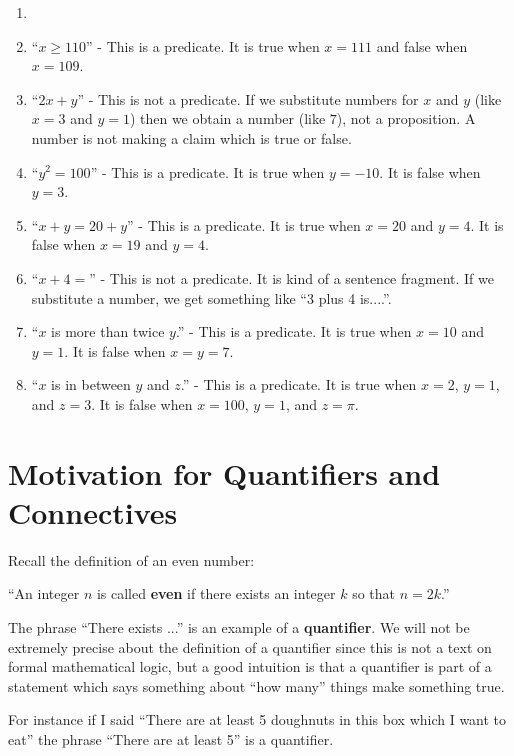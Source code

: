 \begin{solutions}
	
	\begin{enumerate}
		\item[] \mbox{}
		\item ``$x \geq 110$'' - This is a predicate.  It is true when $x = 111$ and false when $x = 109$.
		\item ``$2x+y$'' - This is not a predicate.  If we substitute numbers for $x$ and $y$ (like $x  = 3$  and $y=1$) then we obtain a number (like $7$), not a proposition.  A number is not making a claim which is true or false. 
		\item ``$y^2  = 100$'' - This is a predicate.  It is true when $y = -10$.  It is false when $y = 3$.
		\item ``$x + y = 20 + y$'' - This is a predicate.  It is true when $x = 20$ and $y=4$.  It is false when $x = 19$ and $y=4$.
		\item ``$x+4 = $'' - This is not a predicate.  It is kind of a sentence fragment.  If we substitute a number, we get something like ``3 plus 4 is....''. 
		\item ``$x$ is more than twice $y$.'' - This is a predicate.  It is true when $x = 10$ and $y=1$.  It is false when $x = y = 7$. 
		\item ``$x$ is in between $y$ and $z$.'' - This is a predicate.  It is true when $x = 2$, $y=1$, and $z = 3$.  It is false when $x = 100$, $y = 1$, and $z = \pi$.
	\end{enumerate}
	
\end{solutions}

\section{Motivation for Quantifiers and Connectives}

Recall the definition of an even number:

``An integer $n$ is called \textbf{even} if there exists an integer $k$ so that $n = 2k$.''

The phrase ``There exists ...'' is an example of a  \textbf{quantifier}.  We will not be extremely precise about the definition of a quantifier since this is not a text on formal mathematical logic, but a good intuition is that a quantifier is part of a statement which says something about ``how many'' things make something true.

For instance if I said ``There are at least 5 doughnuts in this box which I want to eat'' the phrase ``There are at least 5'' is a quantifier.

